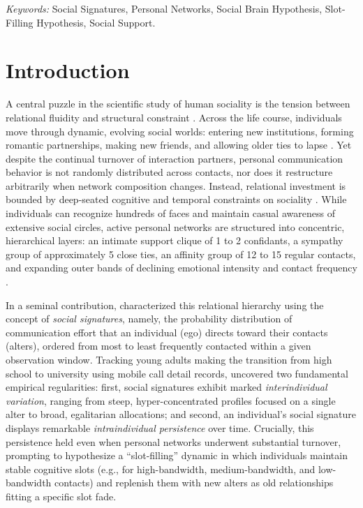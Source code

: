 \documentclass[11pt,letterpaper]{article}
\begin{document}
\vspace{1em}
\noindent\textit{Keywords:} Social Signatures, Personal Networks, Social Brain Hypothesis, Slot-Filling Hypothesis, Social Support.

\newpage

\section{Introduction}

A central puzzle in the scientific study of human sociality is the tension between relational fluidity and structural constraint \citep{mcpherson2001birds-2dc, rivera2010dynamics-e3e}. Across the life course, individuals move through dynamic, evolving social worlds: entering new institutions, forming romantic partnerships, making new friends, and allowing older ties to lapse \citep{suitor1997its-18f}. Yet despite the continual turnover of interaction partners, personal communication behavior is not randomly distributed across contacts, nor does it restructure arbitrarily when network composition changes. Instead, relational investment is bounded by deep-seated cognitive and temporal constraints on sociality \citep{dunbar1992neocortex,dunbar1998social,miritello2013time}. While individuals can recognize hundreds of faces and maintain casual awareness of extensive social circles, active personal networks are structured into concentric, hierarchical layers: an intimate support clique of 1 to 2 confidants, a sympathy group of approximately 5 close ties, an affinity group of 12 to 15 regular contacts, and expanding outer bands of declining emotional intensity and contact frequency \citep{dunbar2018anatomy,roberts2009exploring,sutcliffe2012relationships}.

In a seminal contribution, \citet{saramaeki2014persistence} characterized this relational hierarchy using the concept of \textit{social signatures}, namely, the probability distribution of communication effort that an individual (ego) directs toward their contacts (alters), ordered from most to least frequently contacted within a given observation window. Tracking young adults making the transition from high school to university using mobile call detail records, \citet{saramaeki2014persistence} uncovered two fundamental empirical regularities: first, social signatures exhibit marked \textit{interindividual variation}, ranging from steep, hyper-concentrated profiles focused on a single alter to broad, egalitarian allocations; and second, an individual's social signature displays remarkable \textit{intraindividual persistence} over time. Crucially, this persistence held even when personal networks underwent substantial turnover, prompting \citet{saramaeki2014persistence} to hypothesize a ``slot-filling'' dynamic in which individuals maintain stable cognitive slots (e.g., for high-bandwidth, medium-bandwidth, and low-bandwidth contacts) and replenish them with new alters as old relationships fitting a specific slot fade.
\end{document}
